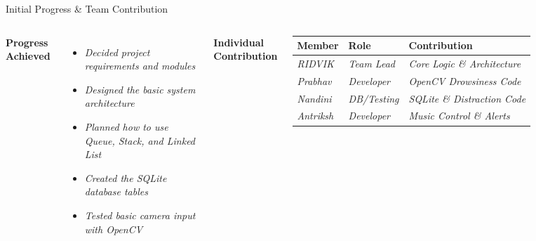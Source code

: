 \documentclass[aspectratio=169,11pt]{beamer}
\newcommand{\placeholder}[1]{\textit{\color{GEUGrey}#1}}
\begin{document}
\begin{frame}{Initial Progress \& Team Contribution}
\begin{columns}[T,totalwidth=\textwidth]
\textbf{\color{GEUBlue}Progress Achieved}
\begin{itemize}\itemsep1pt
\item \placeholder{Decided project requirements and modules}
\item \placeholder{Designed the basic system architecture}
\item \placeholder{Planned how to use Queue, Stack, and Linked List}
\item \placeholder{Created the SQLite database tables}
\item \placeholder{Tested basic camera input with OpenCV}
\end{itemize}
\textbf{\color{GEUBlue}Individual Contribution}
\vspace{2mm}
\scriptsize
\begin{tabularx}{\textwidth}{@{}p{1.8cm}p{2.0cm}X@{}}
\toprule
Member & Role & Contribution\\
\midrule
\placeholder{RIDVIK} & \placeholder{Team Lead} & \placeholder{Core Logic \& Architecture}\\
\placeholder{Prabhav} & \placeholder{Developer} & \placeholder{OpenCV Drowsiness Code}\\
\placeholder{Nandini} & \placeholder{DB/Testing} & \placeholder{SQLite \& Distraction Code}\\
\placeholder{Antriksh} & \placeholder{Developer} & \placeholder{Music Control \& Alerts}\\
\bottomrule
\end{tabularx}
\end{columns}
\end{frame}
\end{document}
